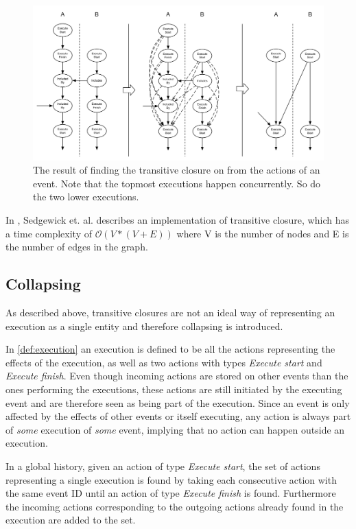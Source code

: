 	\begin{figure}[H]
		\centering
		\includegraphics[width=\textwidth]{5orderofexecution/images/trans.pdf}
		\caption{The result of finding the transitive closure on from the actions of an event. Note that the topmost executions happen concurrently. So do the two lower executions.}
		\label{fig:problem:trans}
	\end{figure}
	
	\newpar In \cite{sedgewick2011algorithms}, Sedgewick et. al. describes an implementation of transitive closure, which has a time complexity of $\mathcal{O}(V * (V + E))$ where V is the number of nodes and E is the number of edges in the graph.
	
	\subsection{Collapsing}
	As described above, transitive closures are not an ideal way of representing an execution as a single entity and therefore collapsing is introduced.
	
	\newpar In \autoref{def:execution} an execution is defined to be all the actions representing the effects of the execution, as well as two actions with types \textit{Execute start} and \textit{Execute finish}. Even though incoming actions are stored on other events than the ones performing the executions, these actions are still initiated by the executing event and are therefore seen as being part of the execution. Since an event is only affected by the effects of other events or itself executing, any action is always part of \textit{some} execution of \textit{some} event, implying that no action can happen outside an execution.

	\newpar In a global history, given an action of type \textit{Execute start}, the set of actions representing a single execution is found by taking each consecutive action with the same event ID until an action of type \textit{Execute finish} is found. Furthermore the incoming actions corresponding to the outgoing actions already found in the execution are added to the set.
	
